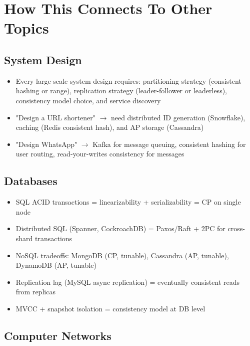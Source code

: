 \documentclass[11pt]{article}
\providecommand{\tightlist}{\setlength{\itemsep}{1pt}\setlength{\parskip}{0pt}}
\begin{document}
\section{How This Connects To Other Topics}\label{how-this-connects-to-other-topics}

\subsection{System Design}\label{system-design}

\begin{itemize}
\tightlist
\item
  Every large-scale system design requires: partitioning strategy (consistent hashing or range), replication strategy (leader-follower or leaderless), consistency model choice, and service discovery
\item
  "Design a URL shortener" \(\rightarrow\) need distributed ID generation (Snowflake), caching (Redis consistent hash), and AP storage (Cassandra)
\item
  "Design WhatsApp" \(\rightarrow\) Kafka for message queuing, consistent hashing for user routing, read-your-writes consistency for messages
\end{itemize}

\subsection{Databases}\label{databases}

\begin{itemize}
\tightlist
\item
  SQL ACID transactions = linearizability + serializability = CP on single node
\item
  Distributed SQL (Spanner, CockroachDB) = Paxos/Raft + 2PC for cross-shard transactions
\item
  NoSQL tradeoffs: MongoDB (CP, tunable), Cassandra (AP, tunable), DynamoDB (AP, tunable)
\item
  Replication lag (MySQL async replication) = eventually consistent reads from replicas
\item
  MVCC + snapshot isolation = consistency model at DB level
\end{itemize}

\subsection{Computer Networks}\label{computer-networks}
\end{document}
